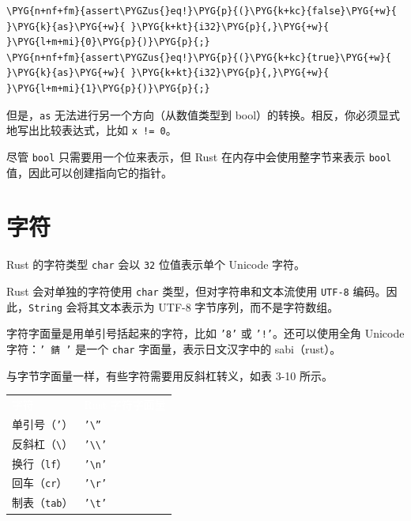\begin{Verbatim}[commandchars=\\\{\},breaklines=true,breakanywhere=true,fontsize=\codefont,xleftmargin=17bp]
\PYG{n+nf+fm}{assert\PYGZus{}eq!}\PYG{p}{(}\PYG{k+kc}{false}\PYG{+w}{ }\PYG{k}{as}\PYG{+w}{ }\PYG{k+kt}{i32}\PYG{p}{,}\PYG{+w}{ }\PYG{l+m+mi}{0}\PYG{p}{)}\PYG{p}{;}
\PYG{n+nf+fm}{assert\PYGZus{}eq!}\PYG{p}{(}\PYG{k+kc}{true}\PYG{+w}{  }\PYG{k}{as}\PYG{+w}{ }\PYG{k+kt}{i32}\PYG{p}{,}\PYG{+w}{ }\PYG{l+m+mi}{1}\PYG{p}{)}\PYG{p}{;}
\end{Verbatim}

但是，\texttt{as} 无法进行另一个方向（从数值类型到 bool）的转换。相反，你必须显式地写出比较表达式，比如 \texttt{x != 0}。

尽管 \texttt{bool} 只需要用一个位来表示，但 Rust 在内存中会使用整字节来表示 \texttt{bool} 值，因此可以创建指向它的指针。

\section{字符}

Rust 的字符类型 \texttt{char} 会以 \texttt{32} 位值表示单个 Unicode 字符。

Rust 会对单独的字符使用 \texttt{char} 类型，但对字符串和文本流使用 \texttt{UTF-8} 编码。因此，\texttt{String} 会将其文本表示为 UTF-8 字节序列，而不是字符数组。

字符字面量是用单引号括起来的字符，比如 \texttt{'8'} 或 \texttt{'!'}。还可以使用全角 Unicode 字符：\texttt{' 錆 '} 是一个 \texttt{char} 字面量，表示日文汉字中的 sabi（rust）。

与字节字面量一样，有些字符需要用反斜杠转义，如表 3-10 所示。


\myTableBegin
\begin{tabularx}{\textwidth}{@{}>{\hsize=0.889\hsize\raggedright\arraybackslash}X>{\hsize=1.111\hsize\raggedright\arraybackslash}X@{}}
\rowcolor{tabhead}\textcolor{white}{字符} & \textcolor{white}{Rust 字符字面量} \\
单引号（\texttt{'}） & \texttt{'\textbackslash{}''} \\
反斜杠（\texttt{\textbackslash{}}） & \texttt{'\textbackslash{}\textbackslash{}'} \\
换行（\texttt{lf}） & \texttt{'\textbackslash{}n'} \\
回车（\texttt{cr}） & \texttt{'\textbackslash{}r'} \\
制表（\texttt{tab}） & \texttt{'\textbackslash{}t'} \\
\end{tabularx}
\myTableEnd


